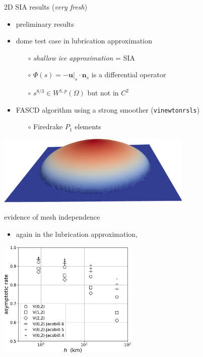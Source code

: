 \documentclass[svgnames,
               hyperref={colorlinks,citecolor=DeepPink4,linkcolor=FireBrick,urlcolor=Maroon},
               usepdftitle=false]  %
               {beamer}
\newcommand{\bn}{\mathbf{n}}
\newcommand{\bu}{\mathbf{u}}
\begin{document}
\begin{frame}{2D SIA results (\emph{very fresh})}

\begin{itemize}
\item preliminary results
\item dome test case in lubrication approximation
    \begin{itemize}
    \item[$\circ$] \emph{shallow ice approximation} = SIA
    \item[$\circ$] $\Phi(s) = -\bu|_s \cdot \bn_s$ is a differential operator
    \item[$\circ$] $s^{8/3} \in W^{1,p}(\Omega)$ but not in $C^2$
    \end{itemize}
\item FASCD algorithm using a strong smoother (\texttt{vinewtonrsls})
    \begin{itemize}
    \item[$\circ$] Firedrake $P_1$ elements
    \end{itemize}
\end{itemize}

\begin{center}
\includegraphics[width=0.7\textwidth]{images/fascd-firedrake-dome.png}
\end{center}
\end{frame}


\begin{frame}{evidence of mesh independence}

\begin{itemize}
\item again in the lubrication approximation,
\end{itemize}

\includegraphics[width=0.5\textwidth]{images/sia-asymprates.pdf}
\end{frame}
\end{document}
